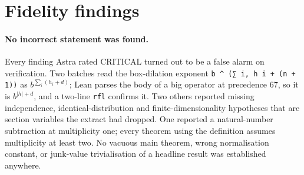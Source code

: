 \documentclass[11pt]{article}
\begin{document}
\section{Fidelity findings}

\paragraph{No incorrect statement was found.} Every finding Astra rated CRITICAL turned out to be a false alarm on verification. Two batches read the box-dilation exponent \texttt{b \^{} (∑ i, h i + (n + 1))} as $b^{\sum_i(h_i+d)}$; Lean parses the body of a big operator at precedence 67, so it is $b^{|h|+d}$, and a two-line \texttt{rfl} confirms it. Two others reported missing independence, identical-distribution and finite-dimensionality hypotheses that are section variables the extract had dropped. One reported a natural-number subtraction at multiplicity one; every theorem using the definition assumes multiplicity at least two. No vacuous main theorem, wrong normalisation constant, or junk-value trivialisation of a headline result was established anywhere.
\end{document}
